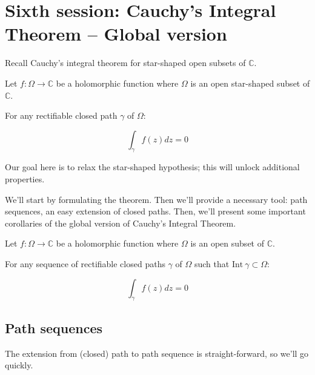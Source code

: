 \section{Sixth session: Cauchy's Integral Theorem  -- Global version}

Recall Cauchy's integral theorem for star-shaped open subsets of $\mathbb{C}$.

\begin{thm*}
    Let $f: \Omega \rightarrow \mathbb{C}$ be a holomorphic function where $\Omega$ is an open star-shaped subset of $\mathbb{C}$.

    For any rectifiable closed path $\gamma$ of $\Omega$:

    $$ \int_\gamma f(z)dz = 0 $$
\end{thm*}

Our goal here is to relax the star-shaped hypothesis; this will unlock additional properties.

We'll start by formulating the theorem. Then we'll provide a necessary tool: path sequences, an easy extension of closed paths. Then, we'll present some important corollaries of the global version of Cauchy's Integral Theorem.


\begin{thm*}
    Let $f: \Omega \rightarrow \mathbb{C}$ be a holomorphic function where $\Omega$ is an open subset of $\mathbb{C}$.

    For any sequence of rectifiable closed paths $\gamma$ of $\Omega$ such that $\mathrm{Int}~\gamma \subset \Omega$:

    $$ \int_\gamma f(z)dz = 0 $$
\end{thm*}

\subsection*{Path sequences}
The extension from (closed) path to path sequence is straight-forward, so we'll go quickly. 

